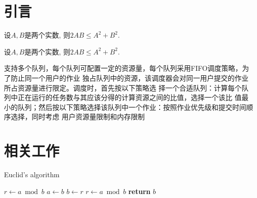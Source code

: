 \documentclass[a4paper,10pt,adobefonts]{ctexart}
\begin{document}
\section{引言}

\begin{theorem}[均值不等式]
设$A,B$是两个实数, 则$2AB\leq A^2+B^2$.
\end{theorem}

\begin{definition}[均值不等式]
设$A,B$是两个实数, 则$2AB\leq A^2+B^2$.
\end{definition}

支持多个队列，每个队列可配置一定的资源量，每个队列采用FIFO调度策略，为了防止同一个用户的作业
独占队列中的资源，该调度器会对同一用户提交的作业\cite{knuth}所占资源量进行限定。调度时，首先按以下策略选
择一个合适队列：计算每个队列中正在运行的任务数与其应该分得的计算资源之间的比值，选择一个该比
值最小的队列；然后按以下策略选择该队列中一个作业：按照作业优先级\cite{lamport}和提交时间顺序选择，同时考虑
用户资源量限制和内存限制

\section{相关工作}

\begin{algorithm}
\caption{Euclid’s algorithm}\label{euclid}
\begin{algorithmic}[1]
   \State $r\gets a\bmod b$
      \State $a\gets b$
      \State $b\gets r$
      \State $r\gets a\bmod b$
   \EndWhile\label{euclidendwhile}
   \State \textbf{return} $b$
\EndProcedure
\end{algorithmic}
\end{algorithm}

\appendix
\small
\setlength{\itemsep}{0pt}
\setlength{\parskip}{0pt}  %


\end{document}
